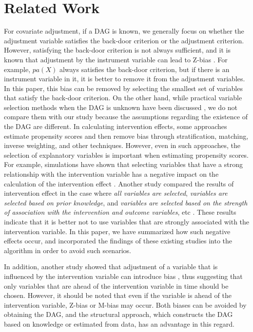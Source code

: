 \section{Related Work}
For covariate adjustment, if a DAG is known, we generally focus on whether the adjustment variable satisfies the back-door criterion or the adjustment criterion. However, satisfying the back-door criterion is not always sufficient, and it is known that adjustment by the instrument variable can lead to Z-bias \cite{ding2017instrumental, hernan2024causal}. For example, $pa(X)$ always satisfies the back-door criterion, but if there is an instrument variable in it, it is better to remove it from the adjustment variables. In this paper, this bias can be removed by selecting the smallest set of variables that satisfy the back-door criterion. On the other hand, while practical variable selection methods when the DAG is unknown have been discussed \cite{vanderweele2011new, vanderweele2019principles}, we do not compare them with our study because the assumptions regarding the existence of the DAG are different. In calculating intervention effects, some approaches \cite{rosenbaum1983central} estimate propensity scores and then remove bias through stratification, matching, inverse weighting, and other techniques. However, even in such approaches, the selection of explanatory variables is important when estimating propensity scores. For example, simulations have shown that selecting variables that have a strong relationship with the intervention variable has a negative impact on the calculation of the intervention effect \cite{brookhart2006variable}. Another study compared the results of intervention effect in the case where \textit{all variables are selected}, \textit{variables are selected based on prior knowledge}, and \textit{variables are selected based on the strength of association with the intervention and outcome variables}, etc \cite{patrick2011implications}. These results indicate that it is better not to use variables that are strongly associated with the intervention variable. In this paper, we have summarized how such negative effects occur, and incorporated the findings of these existing studies into the algorithm in order to avoid such scenarios.

In addition, another study showed that adjustment of a variable that is influenced by the intervention variable can introduce bias \cite{rosenbaum1984consequences}, thus suggesting that only variables that are ahead of the intervention variable in time should be chosen. However, it should be noted that even if the variable is ahead of the intervention variable, Z-bias or M-bias \cite{cole2010illustrating, greenland2003quantifying, vanderweele2019principles, pearl2009causality} may occur. Both biases can be avoided by obtaining the DAG, and the structural approach, which constructs the DAG based on knowledge or estimated from data, has an advantage in this regard.

